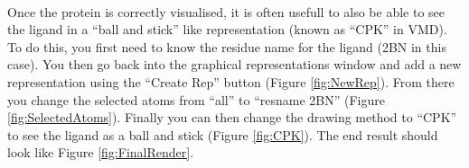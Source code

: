     \paragraph{}
        Once the protein is correctly visualised, it is often usefull to also be able to see the ligand in a \enquote{ball and stick} like representation (known as \enquote{CPK} in VMD). To do this, you first need to know the residue name for the ligand (2BN in this case). You then go back into the graphical representations window and add a new representation using the \enquote{Create Rep} button (Figure \ref{fig:NewRep}). From there you change the selected atoms from \enquote{all} to \enquote{resname 2BN} (Figure \ref{fig:SelectedAtoms}). Finally you can then change the drawing method to \enquote{CPK} to see the ligand as a ball and stick (Figure \ref{fig:CPK}). The end result should look like Figure \ref{fig:FinalRender}.

